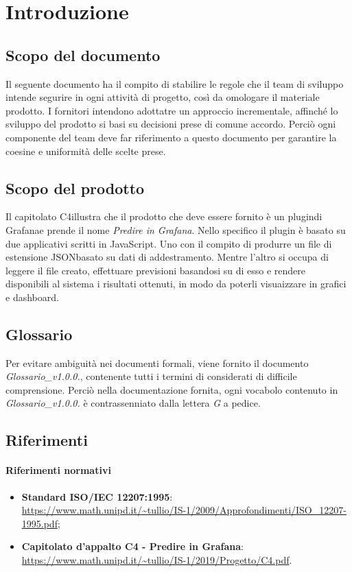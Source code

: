 \section{Introduzione}

\subsection{Scopo del documento}
Il seguente documento ha il compito di stabilire le regole che il team di sviluppo intende segurire in ogni attività di progetto, così da omologare il materiale prodotto.
I fornitori intendono adottatre un approccio incrementale\glo, affinché lo sviluppo del prodotto si basi su decisioni prese di comune accordo. Perciò ogni componente del team deve far riferimento a questo documento per garantire la coesine e uniformità delle scelte prese.

\subsection{Scopo del prodotto}
Il capitolato {C4}\glo illustra che il prodotto che deve essere fornito è un plugin\glo di Grafana\glo e prende il nome \textit{Predire in Grafana}. Nello specifico il plugin è basato su due applicativi scritti in JavaScript\glo. Uno con il compito di produrre un file di estensione JSON\glo basato su dati di addestramento\glo. Mentre l'altro si occupa di leggere il file creato, effettuare previsioni basandosi su di esso e rendere disponibili al sistema i risultati ottenuti, in modo da poterli 	visuaizzare in grafici e dashboard.
\subsection{Glossario}
Per evitare ambiguità nei documenti formali, viene fornito il documento \textit{Glossario\_v1.0.0.}, contenente tutti i termini di considerati di difficile comprensione. Perciò nella documentazione fornita, ogni vocabolo contenuto in \textit{Glossario\_v1.0.0.} è contrassenniato dalla lettera \textit{G} a pedice.
\subsection{Riferimenti}
\paragraph{Riferimenti normativi}
\begin{itemize}
	\item \textbf{Standard ISO/IEC 12207:1995}: \\
	\url{https://www.math.unipd.it/~tullio/IS-1/2009/Approfondimenti/ISO_12207-1995.pdf};
	\item \textbf{Capitolato d'appalto C4 - Predire in Grafana}: \\
	\url{https://www.math.unipd.it/~tullio/IS-1/2019/Progetto/C4.pdf}.	
\end{itemize}
